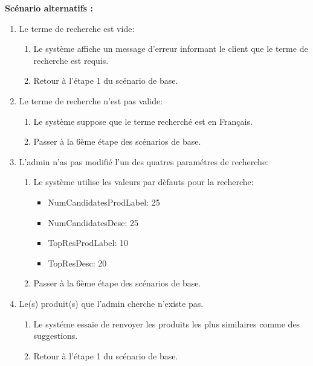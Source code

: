 \newpage
\textbf{Scénario alternatifs : }
\begin{enumerate}
	\item Le terme de recherche est vide:
	      \begin{enumerate}
		      \item Le système affiche un message d'erreur informant le client que le terme de recherche est requis.
		      \item Retour à l'étape 1 du scénario de base.
	      \end{enumerate}
	\item Le terme de recherche n'est pas valide:
	      \begin{enumerate}
		      \item Le système suppose que le terme recherché est en Français.
		      \item Passer à la 6ème étape des scénarios de base.
	      \end{enumerate}
	\item L'admin n'as pas modifié l'un des quatres paramétres de recherche:
	      \begin{enumerate}
		      \item Le système utilise les valeurs par dèfauts pour la recherche:
		            \begin{itemize}
			            \item NumCandidatesProdLabel: 25
			            \item NumCandidatesDesc: 25
			            \item TopResProdLabel: 10
			            \item TopResDesc: 20
		            \end{itemize}
		      \item Passer à la 6ème étape des scénarios de base.
	      \end{enumerate}
	\item Le(s) produit(s) que l'admin cherche n'existe pas.
	      \begin{enumerate}
		      \item Le systéme essaie de renvoyer les produits les plus similaires comme des suggestions.
		      \item Retour à l'étape 1 du scénario de base.
	      \end{enumerate}
\end{enumerate}


